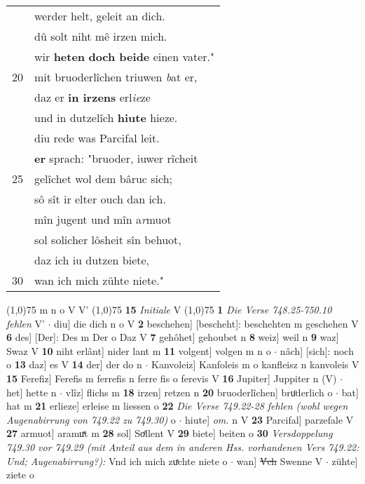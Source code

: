 \documentclass[8pt,a4paper,notitlepage]{article}
\begin{document}
\begin{table}[ht]
\begin{minipage}[t]{0.5\linewidth}
\begin{tabular}{rl}
 & werder helt, geleit an dich.\\ 
 & dû solt niht mê irzen mich.\\ 
 & wir \textbf{heten} \textbf{doch beide} einen vater."\\ 
20 & mit bruoderlîchen triuwen \textit{b}at er,\\ 
 & daz er \textbf{in irzens} erl\textit{ie}ze\\ 
 & und in dutzelîch \textbf{hiute} hieze.\\ 
 & diu rede was Parcifal leit.\\ 
 & \textbf{er} sprach: "bruoder, iuwer rîcheit\\ 
25 & gelîchet wol dem bâruc sich;\\ 
 & sô sît ir elter ouch dan ich.\\ 
 & mîn jugent und mîn a\textit{r}muot\\ 
 & sol solicher lôsheit sîn behuot,\\ 
 & daz ich iu dutzen biete,\\ 
30 & wan ich mich zühte niete."\\ 
\end{tabular}
\scriptsize
\line(1,0){75} \newline
m n o V V' \newline
\line(1,0){75} \newline
\textbf{15} \textit{Initiale} V  \newline
\line(1,0){75} \newline
\textbf{1} \textit{Die Verse 748.25-750.10 fehlen} V'   $\cdot$ diu] die dich n o V \textbf{2} beschehen] [bescheht]: beschehten m geschehen V \textbf{6} des] [Der]: Des m Der o Daz V \textbf{7} gehôhet] gehoubet n \textbf{8} weiz] weil n \textbf{9} waz] Swaz V \textbf{10} niht erlânt] nider lant m \textbf{11} volgent] volgen m n o  $\cdot$ nâch] [sich]: noch o \textbf{13} daz] es V \textbf{14} der] der do n  $\cdot$ Kanvoleiz] Kanfoleis m o kanfleisz n kanvoleis V \textbf{15} Ferefiz] Ferefis m ferrefis n ferre fis o ferevis V \textbf{16} Jupiter] Juppiter n (V)  $\cdot$ het] hette n  $\cdot$ vlîz] flichs m \textbf{18} irzen] retzen n \textbf{20} bruoderlîchen] bruͦderlich o  $\cdot$ bat] hat m \textbf{21} erlieze] erleise m liessen o \textbf{22} \textit{Die Verse 749.22-28 fehlen (wohl wegen Augenabirrung von 749.22 zu 749.30)} o   $\cdot$ hiute] \textit{om.} n V \textbf{23} Parcifal] parzefale V \textbf{27} armuot] aramuͯt m \textbf{28} sol] Soͤllent V \textbf{29} biete] beiten o \textbf{30} \textit{Versdoppelung 749.30 vor 749.29 (mit Anteil aus dem in anderen Hss. vorhandenen Vers 749.22: Und; Augenabirrung?):} Vnd ich mich zuͯchte niete o   $\cdot$ wan] \sout{V́ch} Swenne V  $\cdot$ zühte] ziete o \newline
\end{minipage}
\end{table}
\end{document}
